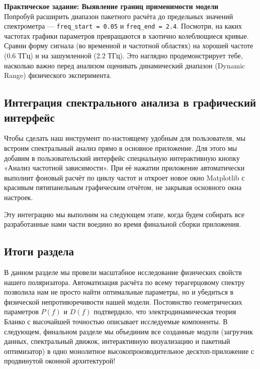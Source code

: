 \begin{minitaskbox}
\textbf{Практическое задание: Выявление границ применимости модели}
\\
Попробуй расширить диапазон пакетного расчёта до предельных значений спектрометра — \texttt{freq\_start = 0.05} и \texttt{freq\_end = 2.4}. Посмотри, на каких частотах графики параметров превращаются в хаотично колеблющиеся кривые. Сравни форму сигнала (во временной и частотной областях) на хорошей частоте ($0.6$ ТГц) и на зашумленной ($2.2$ ТГц). Это наглядно продемонстрирует тебе, насколько важно перед анализом оценивать динамический диапазон (Dynamic Range) физического эксперимента.
\end{minitaskbox}

\subsection{Интеграция спектрального анализа в графический интерфейс}

Чтобы сделать наш инструмент по-настоящему удобным для пользователя, мы встроим спектральный анализ прямо в основное приложение. Для этого мы добавим в пользовательский интерфейс специальную интерактивную кнопку «Анализ частотной зависимости». При её нажатии приложение автоматически выполнит фоновый расчёт по циклу частот и откроет новое окно Matplotlib с красивым пятипанельным графическим отчётом, не закрывая основного окна настроек.

Эту интеграцию мы выполним на следующем этапе, когда будем собирать все разработанные нами части воедино во время финальной сборки приложения.

\subsection{Итоги раздела}
В данном разделе мы провели масштабное исследование физических свойств нашего поляризатора. Автоматизация расчёта по всему терагерцовому спектру позволила нам не просто найти оптимальные параметры, но и убедиться в физической непротиворечивости нашей модели. Постоянство геометрических параметров $P(f)$ и $D(f)$ подтвердило, что электродинамическая теория Бланко с высочайшей точностью описывает исследуемые компоненты. В следующем, финальном разделе мы объединим все созданные модули (загрузчик данных, спектральный движок, интерактивную визуализацию и пакетный оптимизатор) в одно монолитное высокопроизводительное десктоп-приложение с продвинутой оконной архитектурой!
